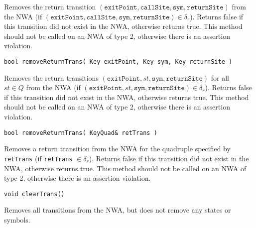 \begin{description}
    Removes the return transition
    $(\texttt{exitPoint},\texttt{callSite},\texttt{sym},\texttt{returnSite})$
    from the NWA (if
    $(\texttt{exitPoint},\texttt{callSite},\texttt{sym},\texttt{returnSite})
    \in \delta_r$).  Returns false if this transition did not exist in the
    NWA, otherwise returns true.  This method should not be called on an NWA
    of type 2, otherwise there is an assertion violation.

  \item\texttt{bool removeReturnTrans( Key exitPoint, Key sym, Key returnSite )} \nopagebreak

    Removes the return transitions
    $(\texttt{exitPoint},st,\texttt{sym},\texttt{returnSite})$ for all \\$st
    \in Q$ from the NWA (if
    $(\texttt{exitPoint},st,\texttt{sym},\texttt{returnSite}) \in \delta_r$).
    Returns false if this transition did not exist in the NWA, otherwise
    returns true.  This method should not be called on an NWA of type 2,
    otherwise there is an assertion violation.

  \item\texttt{bool removeReturnTrans( KeyQuad\& retTrans )} \nopagebreak

    Removes a return transition from the NWA for the quadruple specified by
    \texttt{retTrans} (if \texttt{retTrans} $\in \delta_r$).  Returns false
    if this transition did not exist in the NWA, otherwise returns true.
    This method should not be called on an NWA of type 2, otherwise there is
    an assertion violation.

  \item\texttt{void clearTrans()} \nopagebreak

    Removes all transitions from the NWA, but does not remove any states or
    symbols. \\

\end{description}

